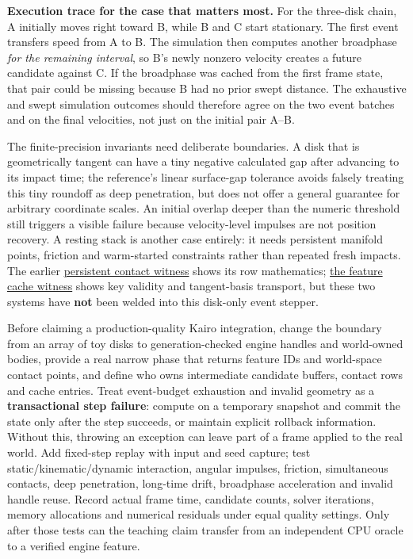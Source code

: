 \textbf{Execution trace for the case that matters most.} For the three-disk chain, A initially moves right toward B, while B and C start stationary. The first event transfers speed from A to B. The simulation then computes another broadphase \emph{for the remaining interval}, so B's newly nonzero velocity creates a future candidate against C. If the broadphase was cached from the first frame state, that pair could be missing because B had no prior swept distance. The exhaustive and swept simulation outcomes should therefore agree on the two event batches and on the final velocities, not just on the initial pair A--B.

The finite-precision invariants need deliberate boundaries. A disk that is geometrically tangent can have a tiny negative calculated gap after advancing to its impact time; the reference's linear surface-gap tolerance avoids falsely treating this tiny roundoff as deep penetration, but does not offer a general guarantee for arbitrary coordinate scales. An initial overlap deeper than the numeric threshold still triggers a visible failure because velocity-level impulses are not position recovery. A resting stack is another case entirely: it needs persistent manifold points, friction and warm-started constraints rather than repeated fresh impacts. The earlier \hyperref[source-file-44c320ffad9698c7abd453e2]{persistent contact witness} shows its row mathematics; \hyperref[source-file-830b13449e1c6505af693753]{the feature cache witness} shows key validity and tangent-basis transport, but these two systems have \textbf{not} been welded into this disk-only event stepper.

Before claiming a production-quality Kairo integration, change the boundary from an array of toy disks to generation-checked engine handles and world-owned bodies, provide a real narrow phase that returns feature IDs and world-space contact points, and define who owns intermediate candidate buffers, contact rows and cache entries. Treat event-budget exhaustion and invalid geometry as a \textbf{transactional step failure}: compute on a temporary snapshot and commit the state only after the step succeeds, or maintain explicit rollback information. Without this, throwing an exception can leave part of a frame applied to the real world. Add fixed-step replay with input and seed capture; test static/kinematic/dynamic interaction, angular impulses, friction, simultaneous contacts, deep penetration, long-time drift, broadphase acceleration and invalid handle reuse. Record actual frame time, candidate counts, solver iterations, memory allocations and numerical residuals under equal quality settings. Only after those tests can the teaching claim transfer from an independent CPU oracle to a verified engine feature.

